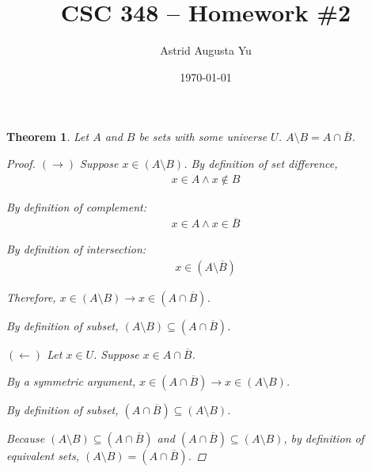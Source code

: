 \documentclass{article}
\author{Astrid Augusta Yu}
\title{CSC 348 -- Homework \#2}
\date{\today}
\newtheorem{theorem}{Theorem}
\numberwithin{subcase}{case}
\begin{document}
\maketitle
\begin{outline}[enumerate]

    \1 \begin{theorem}
        Let $A$ and $B$ be sets with some universe $U$. $A \setminus B = A \cap \overline{B}$.

        \begin{proof}
            $(\rightarrow)$ Suppose $x \in (A \setminus B)$. By definition of set difference, 
            \begin{equation}
                \begin{aligned}
                    x \in A \wedge x \notin B
                \end{aligned}
            \end{equation}
            
            By definition of complement:
            \begin{equation}
                \begin{aligned}
                    x \in A \wedge x \in \overline{B}
                \end{aligned}
            \end{equation}

            By definition of intersection:
            \begin{equation}
                \begin{aligned}
                    x \in (A \setminus \overline{B}) 
                \end{aligned}
            \end{equation}

            Therefore, $x \in (A \setminus B) \rightarrow x \in (A \cap \overline{B})$.

            By definition of subset, $(A \setminus B) \subseteq (A \cap \overline{B})$.

            $(\leftarrow)$ Let $x \in U$. Suppose $x \in A \cap \overline{B}$. 
            
            By a symmetric argument, $x \in (A \cap \overline{B}) \rightarrow x \in (A \setminus B)$.  

            By definition of subset, $(A \cap \overline{B}) \subseteq (A \setminus B)$.

            Because $(A \setminus B) \subseteq (A \cap \overline{B})$ and $(A \cap \overline{B}) \subseteq (A \setminus B)$, 
            by definition of equivalent sets, $(A \setminus B) = (A \cap \overline{B})$.
        \end{proof} 
    \end{theorem}


\end{outline}
\end{document}
